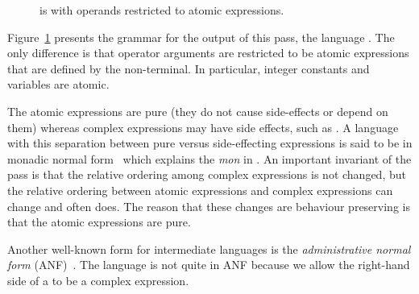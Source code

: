 \documentclass[7x10,nocrop]{TimesAPriori_MIT}%
\def\racketEd{0}
\def\pythonEd{1}
\def\edition{1}
\begin{document}
\begin{figure}[tp]
\centering
\fbox{
\begin{minipage}{0.96\textwidth}
{\if\edition\racketEd
\[
\begin{array}{rcl}
\Atm &::=& \INT{\Int} \MID \VAR{\Var} \\
\Exp &::=& \Atm \MID \READ{} \\
     &\MID& \NEG{\Atm} \MID \ADD{\Atm}{\Atm}  \\
     &\MID&  \LET{\Var}{\Exp}{\Exp} \\
\LangVarANFM{}  &::=& \PROGRAM{\code{'()}}{\Exp}
\end{array}
\]
\fi}
{\if\edition\pythonEd
\[
\begin{array}{l}
  \LvarMonadASTPython \\
\begin{array}{rcl}
\LangVarANFM{}  &::=& \PROGRAM{}{\Stmt^{*}}
\end{array}
\end{array}
\]
\fi}  
\end{minipage}
}
\caption{\LangVarANF{} is \LangVar{} with operands restricted to
  atomic expressions.}
\label{fig:Lvar-anf-syntax}
\end{figure}

Figure~\ref{fig:Lvar-anf-syntax} presents the grammar for the output
of this pass, the language \LangVarANF{}. The only difference is that
operator arguments are restricted to be atomic expressions that are
defined by the \Atm{} non-terminal. In particular, integer constants
and variables are atomic.

The atomic expressions are pure (they do not cause side-effects or
depend on them) whereas complex expressions may have side effects,
such as \READ{}.  A language with this separation between pure versus
side-effecting expressions is said to be in monadic normal
form~\citep{Moggi:1991in,Danvy:2003fk} which explains the \textit{mon}
in \LangVarANF{}. An important invariant of the
 pass is that the relative ordering
among complex expressions is not changed, but the relative ordering
between atomic expressions and complex expressions can change and
often does. The reason that these changes are behaviour preserving is
that the atomic expressions are pure.

Another well-known form for intermediate languages is the
\emph{administrative normal form}
(ANF)~\citep{Danvy:1991fk,Flanagan:1993cg}.
 
%
The \LangVarANF{} language is not quite in ANF because we allow the
right-hand side of a  to be a complex expression.
\end{document}
